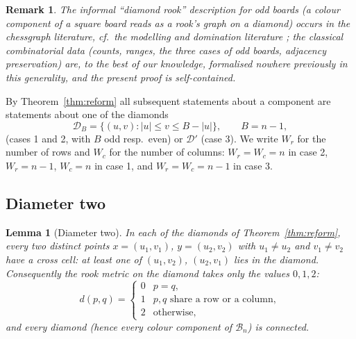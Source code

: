 \documentclass[12pt]{article}
\newtheorem{lemma}[theorem]{Lemma}
\newtheorem{remark}[theorem]{Remark}
\theoremstyle{definition}
\newcommand{\BB}{\mathcal{B}}
\newcommand{\DD}{\mathcal{D}}
\newcommand{\DDs}{\mathcal{D}'}
\begin{document}
\begin{remark}
The informal ``diamond rook'' description for odd boards (a colour component of a square board reads as a rook's graph on a diamond) occurs in the chessgraph literature, cf.\ the modelling and domination literature \cite{berghammer2012,hedetniemi2020}; the classical combinatorial data (counts, ranges, the three cases of odd boards, adjacency preservation) are, to the best of our knowledge, formalised nowhere previously in this generality, and the present proof is self-contained.
\end{remark}

By Theorem~\ref{thm:reform} all subsequent statements about a component are statements about one of the diamonds
\[
\DD_B=\{(u,v):|u|\le v\le B-|u|\},\qquad B=n-1,
\]
(cases 1 and 2, with $B$ odd resp.\ even) or $\DDs$ (case 3). We write $W_r$ for the number of rows and $W_c$ for the number of columns: $W_r=W_c=n$ in case 2, $W_r=n-1$, $W_c=n$ in case 1, and $W_r=W_c=n-1$ in case 3.

\subsection{Diameter two}

\begin{lemma}[Diameter two]\label{lem:diameter}
In each of the diamonds of Theorem~\ref{thm:reform}, every two distinct points $x=(u_1,v_1)$, $y=(u_2,v_2)$ with $u_1\neq u_2$ and $v_1\neq v_2$ have a \emph{cross cell}: at least one of $(u_1,v_2)$, $(u_2,v_1)$ lies in the diamond. Consequently the rook metric on the diamond takes only the values $0,1,2$:
\[
d(p,q)=\begin{cases}0 & p=q,\\ 1 & p,q\text{ share a row or a column},\\ 2 & \text{otherwise},\end{cases}
\]
and every diamond (hence every colour component of $\BB_n$) is connected.
\end{lemma}
\end{document}
